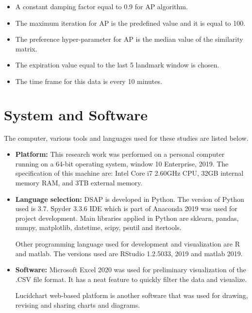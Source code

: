 \begin{itemize}
    \item A constant damping factor equal to 0.9 for AP algorithm.
    \item The maximum iteration for AP is the predefined value and it is equal to 100.
    \item The preference hyper-parameter for AP is the median value of the similarity matrix.
    \item The expiration value equal to the last 5 landmark window is chosen. 
    \item The time frame for this data is every 10 minutes.
    
\end{itemize}






\section{System and Software}
The computer, various tools and languages used for these studies are listed below.

\begin{itemize}
    \item\textbf{Platform:} This research work was performed on a personal computer running on a 64-bit operating system, window 10 Enterprise, 2019. The specification of this machine are: Intel Core i7 2.60GHz CPU, 32GB internal memory RAM, and 3TB external memory. 
    \item\textbf{Language selection:} DSAP is developed in Python. The version of Python used is 3.7. Spyder 3.3.6 IDE which is part of Anaconda 2019 was used for project development. Main libraries applied in Python are sklearn, pandas, numpy, matplotlib, datetime, scipy, psutil and itertools.
    
    Other programming language used for development and visualization are R and matlab. The versions used are RStudio 1.2.5033, 2019 and matlab 2019. 
    
    \item\textbf{Software:} Microsoft Excel 2020 was used for preliminary visualization of the .CSV file format. It has a neat feature to quickly filter the data and visualize.
    
    Lucidchart web-based platform is another software that was used for drawing, revising and sharing charts and diagrams.
    

\end{itemize}


% 
